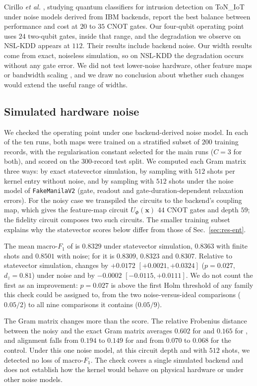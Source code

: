 Cirillo \emph{et al.} \cite{qmi2026}, studying quantum classifiers for intrusion detection on
ToN\_IoT under noise models derived from IBM backends, report the best balance between
performance and cost at $20$ to $35$ CNOT gates. Our four-qubit operating point uses $24$
two-qubit gates, inside that range, and the degradation we observe on NSL-KDD appears at $112$.
Their results include backend noise. Our width results come from exact, noiseless simulation, so
on NSL-KDD the degradation occurs without any gate error. We did not test
lower-noise hardware, other feature maps or bandwidth scaling \cite{shaydulin2022}, and we draw no conclusion about
whether such changes would extend the useful range of widths.

\subsection{Simulated hardware noise}\label{sec:res-noise}

We checked the operating point under one backend-derived noise model. In each of the ten runs,
both maps were trained on a stratified subset of $200$ training records, with the
regularisation constant selected for the main runs ($C=3$ for both), and scored on the
$300$-record test split. We computed each Gram matrix three ways: by exact statevector
simulation, by sampling with $512$ shots per kernel entry without noise, and by sampling with
$512$ shots under the noise model of \texttt{FakeManilaV2} (gate, readout and
gate-duration-dependent relaxation errors). For the noisy case we transpiled the circuits to
the backend's coupling map, which gives the \ZZ{} feature-map circuit $U_{\Phi}(\bm{x})$ $44$
CNOT gates and depth $59$; the fidelity circuit composes two such circuits. The
smaller training subset explains why the statevector scores below differ from those of
Sec.~\ref{sec:res-ent}.

The mean macro-$F_1$ of \QSVM{} is $0.8329$ under statevector simulation, $0.8363$ with finite
shots and $0.8501$ with noise; for \QSVMZ{} it is $0.8309$, $0.8323$ and $0.8307$.
Relative to statevector simulation, \QSVM{} changes by $+0.0172$ $[+0.0021,+0.0324]$
($p=0.027$, $d_z=0.81$) under noise and \QSVMZ{} by $-0.0002$ $[-0.0115,+0.0111]$. We do
not count the first as an improvement: $p=0.027$ is above the first Holm threshold of any family
this check could be assigned to, from the two noise-versus-ideal comparisons ($0.05/2$) to all
nine comparisons it contains ($0.05/9$).

The Gram matrix changes more than the score. The relative Frobenius distance between the noisy
and the exact Gram matrix averages $0.602$ for \QSVM{} and $0.165$ for \QSVMZ{}, and
alignment falls from $0.194$ to $0.149$ for \QSVM{} and from $0.070$ to $0.068$ for the control.
Under this one noise model, at this circuit depth and with $512$ shots, we detected no loss of
macro-$F_1$. The check covers a single simulated backend and does not establish how the kernel
would behave on physical hardware or under other noise models.
